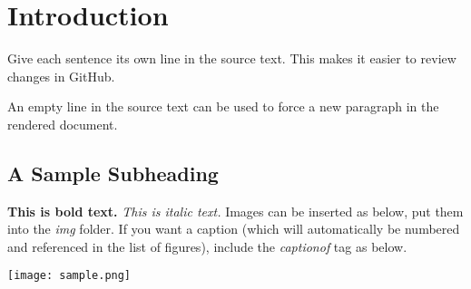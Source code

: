 \newpage
\section{Introduction}

Give each sentence its own line in the source text.
This makes it easier to review changes in GitHub.

An empty line in the source text can be used to force a new paragraph in the rendered document.

\subsection{A Sample Subheading}

\textbf{This is bold text.}
\emph{This is italic text.}
Images can be inserted as below, put them into the \emph{img} folder.
If you want a caption (which will automatically be numbered and referenced in the list of figures), include the \emph{captionof} tag as below.

\begin{center}
	\texttt{[image: sample.png]}
\end{center}